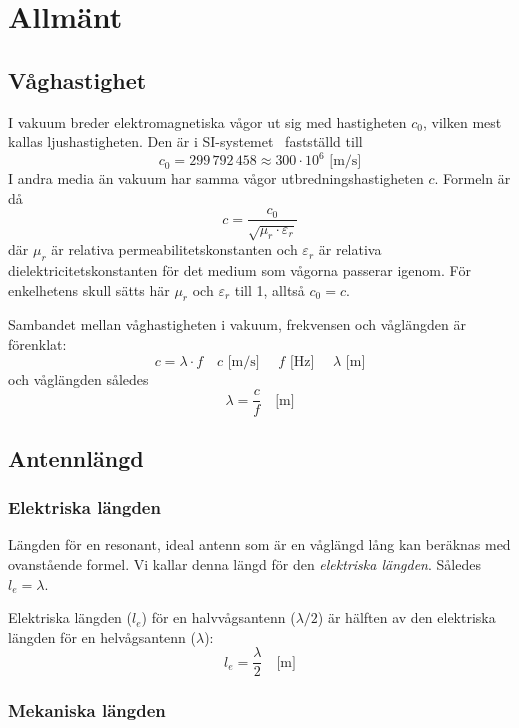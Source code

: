 \section{Allmänt}
\label{sec:antennsystem-allmaent}

\subsection{Våghastighet}
\label{ljushastigheten}

I vakuum breder elektromagnetiska vågor ut sig med hastigheten \(c_0\), vilken
mest kallas ljushastigheten.
Den är i SI-systemet~\cite{SIbrochure8} fastställd till
\[c_0 = 299\,792\,458 \approx 300 \cdot 10^6 \text{ [m/s]}\]
I andra media än vakuum har samma vågor utbredningshastigheten \(c\).
Formeln är då
\[c = \frac{c_0}{\sqrt{\mu_r \cdot \varepsilon_r}}\]
där \(\mu_r\) är relativa permeabilitetskonstanten och \(\varepsilon_r\) är
relativa dielektricitetskonstanten för det medium som vågorna passerar igenom.
För enkelhetens skull sätts här \(\mu_r\) och \(\varepsilon_r\) till 1,
alltså \(c_0 = c\).

Sambandet mellan våghastigheten i vakuum, frekvensen och våglängden är förenklat:
\[ c = \lambda \cdot f \quad c\text{ [m/s] }\quad f\text{ [Hz] } \quad \lambda\text{ [m]}\]
och våglängden således
\[ \lambda = \frac{c}{f} \quad \text{[m]} \]

\subsection{Antennlängd}

\subsubsection{Elektriska längden}

Längden för en resonant, ideal antenn som är en våglängd lång kan beräknas med
ovanstående formel.
Vi kallar denna längd för den \emph{elektriska längden}.
Således \(l_e = \lambda\).

Elektriska längden (\(l_e\)) för en halvvågsantenn (\(\lambda/2\)) är hälften
av den elektriska längden för en helvågsantenn (\(\lambda\)):
\[l_e = \frac{\lambda}{2} \quad \text{[m]}\]

\subsubsection{Mekaniska längden}

